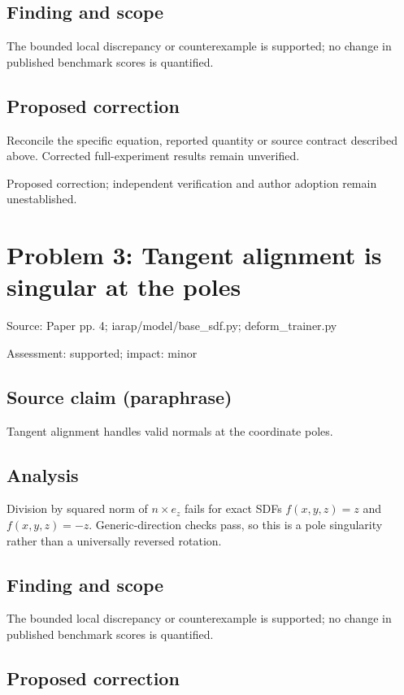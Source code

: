 \documentclass[11pt]{article}
\begin{document}
\subsection*{Finding and scope}

The bounded local discrepancy or counterexample is supported; no change in published benchmark scores is quantified.

\subsection*{Proposed correction}

Reconcile the specific equation, reported quantity or source contract described above. Corrected full-experiment results remain unverified.

Proposed correction; independent verification and author adoption remain unestablished.

\section*{Problem 3: Tangent alignment is singular at the poles}

Source: Paper pp. 4; iarap/model/base\_sdf.py; deform\_trainer.py

Assessment: supported; impact: minor

\subsection*{Source claim (paraphrase)}

Tangent alignment handles valid normals at the coordinate poles.

\subsection*{Analysis}

Division by squared norm of \(n\times e_z\) fails for exact SDFs \(f(x,y,z)=z\) and \(f(x,y,z)=-z\). Generic-direction checks pass, so this is a pole singularity rather than a universally reversed rotation.

\subsection*{Finding and scope}

The bounded local discrepancy or counterexample is supported; no change in published benchmark scores is quantified.

\subsection*{Proposed correction}
\end{document}
